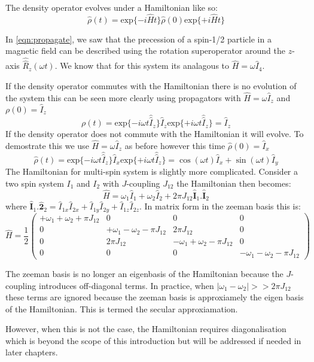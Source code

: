 The density operator evolves under a Hamiltonian like so:
\begin{equation}
  \hat\rho(t) = \text{exp}\{-i\hat{H}t\}\hat\rho(0)\text{exp}\{+i\hat{H}t\}
\end{equation}

In \ref{eqn:propagate}, we saw that the precession of a spin-1/2 particle in a magnetic field can be described using the rotation superoperator around the $z$-axis $\hat{\hat{R}}_z(\omega t)$. We know that for this system its analagous to $\hat{H} = \omega\hat{I}_4$.

If the density operator commutes with the Hamiltonian there is no evolution of the system
this can be seen more clearly using propagators with $\hat{H} = \omega\hat{I}_z$ and $\rho(0) = \hat{I}_z$
\begin{equation}
  \rho(t) = \text{exp}\{-i\omega t\hat{\hat{I}}_z\}\hat{I}_z\text{exp}\{+i\omega t\hat{\hat{I}}_z\} = \hat{I}_z
\end{equation}
If the density operator does not commute with the Hamiltonian it will evolve. To demostrate this we use $\hat{H} = \omega\hat{I}_z$ as before  however this time $\hat\rho(0) = \hat{I}_x$
\begin{equation}
  \hat\rho(t) = \text{exp}\{-i\omega t\hat{\hat{I}}_z\}\hat{I}_x\text{exp}\{+i\omega t\hat{\hat{I}}_z\} = \cos(\omega t)\hat{I}_x + \sin(\omega t)\hat{I}_y
\end{equation}
The Hamiltonian for multi-spin system is slightly more complicated. Consider a two spin
system $I_1$ and $I_2$ with $J$-coupling $J_{12}$ the Hamiltonian then becomes:
\begin{equation}
  \hat{H} = \omega_1\hat{I}_1 + \omega_2\hat{I}_2 + 2\pi J_{12}\hat{\mathbf{I}}_1.\hat{\mathbf{I}}_2
\end{equation}
where $\hat{\mathbf{I}}_1.\hat{\mathbf{2}}_2 = \hat{I}_{1x}\hat{I}_{2x} + \hat{I}_{1y}\hat{I}_{2y} + \hat{I}_{1z}\hat{I}_{2z}$.
In matrix form in the zeeman basis this is:
\begin{equation}
  \hat{H} = \frac{1}{2}\begin{pmatrix}
    +\omega_1 + \omega_2 + \pi J_{12} & 0 & 0 & 0\\
    0 & +\omega_1 - \omega_2 - \pi J_{12} & 2\pi J_{12} & 0\\
    0 & 2\pi J_{12} & -\omega_1 + \omega_2 - \pi J_{12} & 0\\
    0 & 0 & 0 & -\omega_1 - \omega_2 - \pi J_{12}
\end{pmatrix}
\end{equation}

The zeeman basis is no longer an eigenbasis of the Hamiltonian because the $J$-coupling
introduces off-diagonal terms. In practice, when $|\omega_1-\omega_2| >> 2\pi J_{12}$
these terms are ignored because the zeeman basis is approxiamely the eigen basis of the Hamiltonian. This is termed the secular approxiamation.

However, when this is not the case, the Hamiltonian requires diagonalisation which is beyond the scope of this introduction but will be addressed if needed in later chapters.
